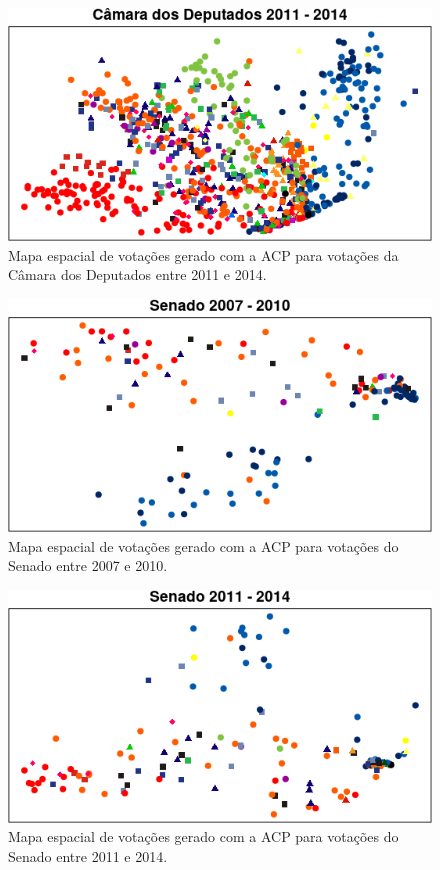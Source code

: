 \documentclass[
	article,			%
	12pt,				%
	oneside,			%
	a4paper,			%
	english,			%
	brazil,				%
	sumario=tradicional,
	oldfontcommands %
	]{abntex2}
\begin{document}
\begin{figure}[h!]
  \centering
  \includegraphics[scale=0.9]{figs/cdep2011-2014.png}
  \caption{Mapa espacial de votações gerado com a ACP para votações da Câmara dos Deputados entre 2011 e 2014.}
  \label{fig:cdep2011-2014}
\end{figure}

\begin{figure}[h!]
  \centering
  \includegraphics[scale=0.9]{figs/sen2007-2010.png}
  \caption{Mapa espacial de votações gerado com a ACP para votações do Senado entre 2007 e 2010.}
  \label{fig:sen2007-2010}
\end{figure}

\begin{figure}[h!]
  \centering
  \includegraphics[scale=0.9]{figs/sen2011-2014.png}
  \caption{Mapa espacial de votações gerado com a ACP para votações do Senado entre 2011 e 2014.}
  \label{fig:sen2011-2014}
\end{figure}
\end{document}
